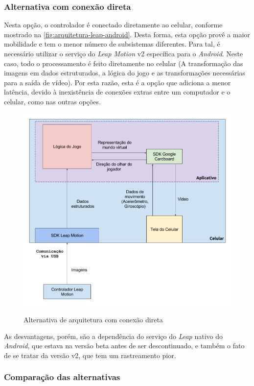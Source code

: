 \subsubsection{Alternativa com conexão direta}\label{subsubsec-arquiteturas-leapmotion-android}

Nesta opção, o controlador é conectado diretamente ao celular, conforme 
mostrado na \autoref{fig:arquitetura-leap-android}. Desta forma, esta opção 
provê a maior mobilidade e tem o menor número de subsistemas diferentes. Para 
tal, é necessário utilizar o serviço do \textit{Leap Motion} v2 específica para 
o \textit{Android}. Neste caso, todo o processamento é feito diretamente no 
celular (A transformação das imagens em dados estruturados, a lógica do jogo e 
as transformações necessárias para a saída de vídeo). Por esta razão, esta é a 
opção que adiciona a menor latência, devido à inexistência de conexões extras 
entre um computador e o celular, como nas outras opções.

\begin{figure} [ht]
	\centering
	\caption{Alternativa de arquitetura com conexão direta}
	\includegraphics[width=0.7\linewidth]{images/Arquitetura-leap-android}
	\legend{\fonteAP}
	\label{fig:arquitetura-leap-android}
\end{figure}

As desvantagens, porém, são a dependência do serviço do \textit{Leap} nativo 
do \textit{Android}, que estava na versão beta antes de ser descontinuado, e 
também o fato de se tratar da versão v2, que tem um rastreamento pior.

\subsubsection{Comparação das alternativas}\label{subsubsec-arquiteturas-comparacao}

